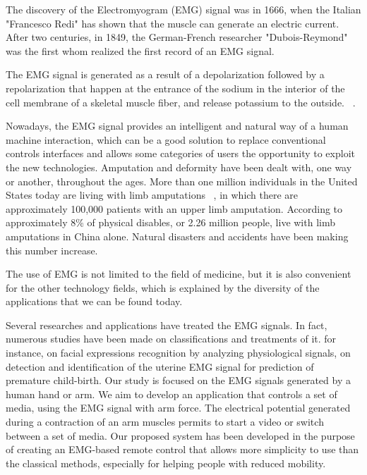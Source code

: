 \documentclass[conference]{IEEEtran}
\begin{document}
The discovery of the Electromyogram (EMG) signal was in 1666, when the Italian "Francesco Redi" has shown that the muscle can generate an electric current. After two centuries,  in 1849, the German-French researcher "Dubois-Reymond" was the first whom realized the first record of an EMG signal.

The EMG signal is generated as a result of a depolarization followed by a repolarization that happen at the entrance of the sodium in the interior of the cell membrane of a skeletal muscle fiber, and release potassium to the outside. ~\cite{Konte}. \par

Nowadays, the EMG signal provides an intelligent and natural way of a human machine interaction, which can be a good solution to replace conventional controls interfaces and allows some categories of users the opportunity to exploit the new technologies. Amputation and deformity have been dealt with, one way or
another, throughout the ages. More than one million individuals in the United States today are living with limb amputations ~\cite{Patricia}, in which there are approximately
100,000 patients with an upper limb amputation. According to~\cite{China} approximately 8\% of physical disables, or 2.26 million people,
live with limb amputations in China alone. Natural disasters and accidents have been making this number increase.
\par
The use of EMG is not limited to the field of medicine, but it is also convenient for the other technology fields, which is explained by the diversity of the applications that we can be found today.
\par
Several researches and applications have treated the EMG signals. In fact, numerous studies have been made on classifications and treatments of it. for instance, on facial expressions recognition by analyzing physiological signals, on detection and identification of the uterine EMG signal for prediction of premature child-birth.
Our study is focused on the EMG signals generated by a human hand or arm.  We aim to develop an application that controls a set of media, using the EMG signal with arm force. The electrical potential generated during a contraction of an arm muscles permits to start a video or switch between a set of media. Our proposed system has been developed in the purpose of creating an EMG-based remote control that allows more simplicity to use than the classical methods, especially for helping people with reduced mobility.
\end{document}
